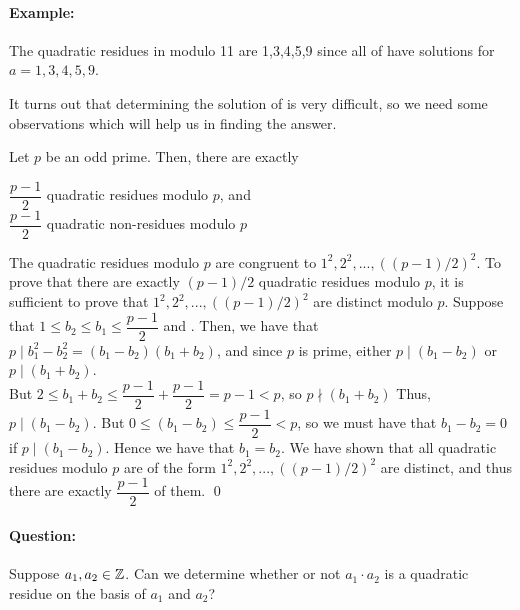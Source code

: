 \documentclass[../main.tex]{subfiles}
\begin{document}
\paragraph{Example:} The quadratic residues in modulo 11 are 1,3,4,5,9 since all of  have solutions for $a=1,3,4,5,9$.

It turns out that determining the solution of  is very difficult, so we need some observations which will help us in finding the answer.

\begin{prop}
    Let $p$ be an odd prime. Then, there are exactly
    \begin{center}
        $\dfrac{p-1}{2}$ quadratic residues modulo $p$, and \\
        $\dfrac{p-1}{2}$ quadratic non-residues modulo $p$
    \end{center}
\end{prop}
\begin{pf}
    The quadratic residues modulo $p$ are congruent to $1^2,2^2,...,((p-1)/2)^2$. To prove that there are exactly $(p-1)/2$ quadratic residues modulo $p$, it is sufficient to prove that $1^2,2^2,...,((p-1)/2)^2$ are distinct modulo $p$. \sspace
    Suppose that $1 \leq b_2 \leq b_1 \leq \dfrac{p-1}{2}$ and . Then, we have that $p \mid b_1^2 - b_2^2 = (b_1-b_2)(b_1+b_2)$, and since $p$ is prime, either $p \mid (b_1-b_2)$ or $p \mid (b_1+b_2)$. \\
    But $2 \leq b_1+b_2 \leq \dfrac{p-1}{2}+\dfrac{p-1}{2}=p-1<p$, so $p \nmid (b_1+b_2)$ \sspace
    Thus, $p \mid (b_1-b_2)$. But $0 \leq (b_1-b_2) \leq \dfrac{p-1}{2} < p$, so we must have that $b_1-b_2=0$ if $p \mid (b_1-b_2).$ Hence we have that $b_1=b_2$. \sspace
    We have shown that all quadratic residues modulo $p$ are of the form $1^2,2^2,...,((p-1)/2)^2$ are distinct, and thus there are exactly $\dfrac{p-1}{2}$ of them. \qed
\end{pf}

\paragraph{Question:} Suppose $a_1,a_2 \in \mathbb{Z}$. Can we determine whether or not $a_1 \cdot a_2$ is a quadratic residue on the basis of $a_1$ and $a_2$?
\end{document}
